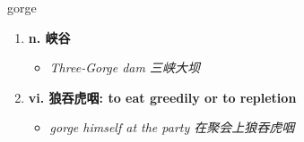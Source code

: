 
\begin{frame}
{\huge gorge}
\begin{center}
\begin{enumerate}\Large
  \item \textbf{n. 峡谷}
  \begin{itemize}
    \item \em{\Large{Three-Gorge dam 三峡大坝}}
  \end{itemize}
  \item \textbf{vi. 狼吞虎咽: to eat greedily or to repletion}
  \begin{itemize}
    \item \em{\Large{gorge himself at the party 在聚会上狼吞虎咽}}
  \end{itemize}
\end{enumerate}
\end{center}
\end{frame}
